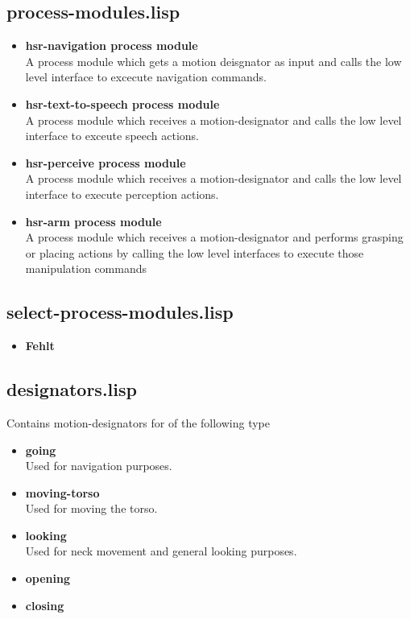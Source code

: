 \documentclass[main.tex]{subfiles}
\begin{document}
	    \subsection{process-modules.lisp}
	     \begin{itemize}
	    	\item \textbf{hsr-navigation process module} \\
		A process module which gets a motion deisgnator as input and calls the low level interface to excecute navigation commands.
		\item \textbf{hsr-text-to-speech process module} \\
		A process module which receives a motion-designator and calls the low level interface to exceute speech actions.
		\item \textbf{hsr-perceive process module} \\
		A process module which receives a motion-designator and calls the low level interface to execute perception actions.
		\item\textbf{hsr-arm process module} \\
		A process module which receives a motion-designator and performs grasping or placing actions by calling the low level interfaces to execute those manipulation commands 
	    \end{itemize}
	    \subsection{select-process-modules.lisp}
	     \begin{itemize}
	    	\item \textbf{Fehlt} \\
	    \end{itemize}
	    \subsection{designators.lisp}
	    Contains motion-designators for of the following type
	    \begin{itemize}
	    	\item \textbf{going} \\
		Used for navigation purposes.
		\item \textbf{moving-torso} \\
		Used for moving the torso.
		\item \textbf{looking} \\
		Used for neck movement and general looking purposes.
		\item \textbf{opening} \\
		
		\item \textbf{closing} \\
	    \end{itemize}
\end{document}
